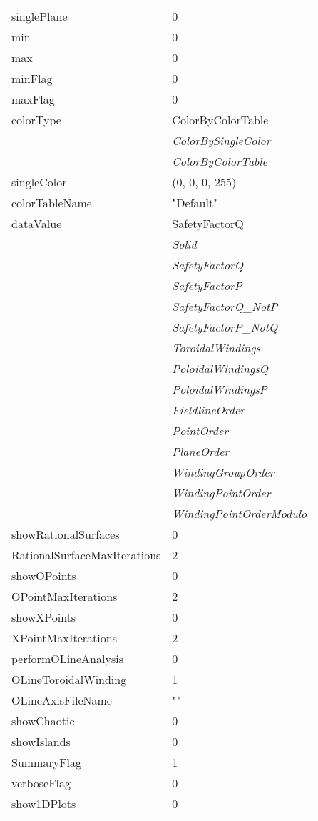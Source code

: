 \documentclass[10pt,a4paper]{report}
\begin{document}
\begin{longtable}{ll}
singlePlane  &  0 \\
min  &  0 \\
max  &  0 \\
minFlag  &  0 \\
maxFlag  &  0 \\
colorType  &  ColorByColorTable   \\
 & {\it  ColorBySingleColor} \\
 & {\it  ColorByColorTable} \\
singleColor  &  (0, 0, 0, 255) \\
colorTableName  &  "Default" \\
dataValue  &  SafetyFactorQ   \\
 & {\it  Solid} \\
 & {\it  SafetyFactorQ} \\
 & {\it  SafetyFactorP} \\
 & {\it  SafetyFactorQ\_NotP} \\
 & {\it  SafetyFactorP\_NotQ} \\
 & {\it  ToroidalWindings} \\
 & {\it  PoloidalWindingsQ} \\
 & {\it  PoloidalWindingsP} \\
 & {\it  FieldlineOrder} \\
 & {\it  PointOrder} \\
 & {\it  PlaneOrder} \\
 & {\it  WindingGroupOrder} \\
 & {\it  WindingPointOrder} \\
 & {\it  WindingPointOrderModulo} \\
showRationalSurfaces  &  0 \\
RationalSurfaceMaxIterations  &  2 \\
showOPoints  &  0 \\
OPointMaxIterations  &  2 \\
showXPoints  &  0 \\
XPointMaxIterations  &  2 \\
performOLineAnalysis  &  0 \\
OLineToroidalWinding  &  1 \\
OLineAxisFileName  &  "" \\
showChaotic  &  0 \\
showIslands  &  0 \\
SummaryFlag  &  1 \\
verboseFlag  &  0 \\
show1DPlots  &  0 \\

\end{longtable}
\end{document}
